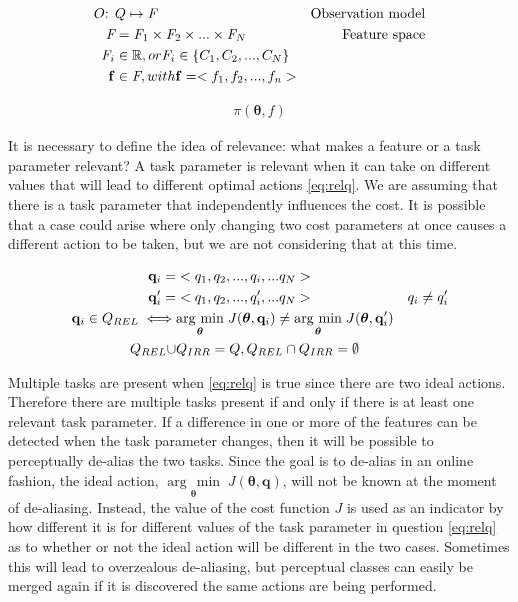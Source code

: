 \documentclass[12pt]{article}
\newcommand{\feat}{f}
\newcommand{\featsp}{\emph{F}}
\newcommand{\taskp}{\mathbf{q}}
\newcommand{\taskpv}{q}
\newcommand{\costf}{J}
\newcommand{\obsm}{O}
\newcommand{\act}{\bm{\theta}}
\newcommand{\taskpsp}{Q}
\newcommand{\featv}{\mathbf{f}}
\newcommand{\argmin}[1]{\underset{#1}{\operatorname{arg}\,\operatorname{min}}\;}
\begin{document}
\begin{align}
\obsm\mbox{: } &\label{eq:obs}\taskpsp \mapsto \featsp& \mbox{Observation model}\\
\featsp &= \featsp_1 \times \featsp_2 \times ... \times \featsp_N & \mbox{Feature space}\\
\featsp_i &\in \mathbb{R}, or \featsp_i \in \{C_1,C_2,...,C_N\}&\notag\\
\featv &\in \featsp, with \featv = <\feat_1,\feat_2,...,\feat_n>&
\end{align}

\begin{align}
\label{eq:fgating}\pi(\act,\feat)
\end{align}

It is necessary to define the idea of relevance: what makes a feature or a task parameter relevant? A task parameter is relevant when it can take on different values that will lead to different optimal actions \eqref{eq:relq}. We are assuming that there is a task parameter that independently influences the cost. It is possible that a case could arise where only changing two cost parameters at once causes a different action to be taken, but we are not considering that at this time. 

\begin{align}
\taskp_i =& <\taskpv_1,\taskpv_2,...,\taskpv_i,...\taskpv_N> \notag & 
\\
\taskp'_i =& <\taskpv_1,\taskpv_2,...,\taskpv'_i,...\taskpv_N> \notag & \taskpv_i \neq \taskpv'_i \\
\label{eq:relq} \taskp_i \in \taskpsp_{REL} \iff&\argmin{\act}\costf(\act,\taskp_i) \neq \argmin{\act}\costf(\act,\taskp'_i)\\
\taskpsp_{REL} \cup & \taskpsp_{IRR} = \taskpsp,   \taskpsp_{REL} \cap \taskpsp_{IRR} = \emptyset 
\end{align}

Multiple tasks are present when \eqref{eq:relq} is true since there are two ideal actions. Therefore there are multiple tasks present if and only if there is at least one relevant task parameter. If a difference in one or more of the features can be detected when the task parameter changes, then it will be possible to perceptually de-alias the two tasks. Since the goal is to de-alias in an online fashion, the ideal action, $\argmin{\act}\costf(\act,\taskp)$, will not be known at the moment of de-aliasing. Instead, the value of the cost function $\costf$ is used as an indicator by how different it is for different values of the task parameter in question \eqref{eq:relq} as to whether or not the ideal action will be different in the two cases. Sometimes this will lead to overzealous de-aliasing, but perceptual classes can easily be merged again if it is discovered the same actions are being performed.
\end{document}
